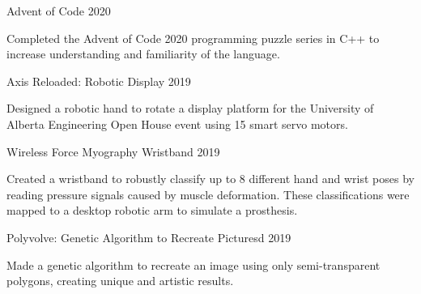 
\begin{cventries}

  \cventry
    {Advent of Code} %
    {} %
    {} %
    {2020} %
    {
      \begin{cvitems} %
        \item {Completed the Advent of Code 2020 programming
        puzzle series in C++ to increase understanding and
        familiarity of the language.}
      \end{cvitems}
    }

  \cventry
    {Axis Reloaded: Robotic Display} %
    {} %
    {} %
    {2019} %
    {
      \begin{cvitems} %
        \item {Designed a robotic hand to rotate a display platform for
        the University of Alberta Engineering Open House event using 15 smart
        servo motors.}
      \end{cvitems}
    }

  \cventry
    {Wireless Force Myography Wristband} %
    {} %
    {} %
    {2019} %
    {
      \begin{cvitems} %
        \item {Created a wristband to robustly classify up to 8 different
        hand and wrist poses by reading pressure signals caused
        by muscle deformation. These classifications were
        mapped to a desktop robotic arm to simulate a prosthesis.}
      \end{cvitems}
    }

  \cventry
    {Polyvolve: Genetic Algorithm to Recreate Picturesd} %
    {} %
    {} %
    {2019} %
    {
      \begin{cvitems} %
        \item {Made a genetic algorithm to recreate an image using
        only semi-transparent polygons, creating unique and
        artistic results.}
      \end{cvitems}
    }

\end{cventries}
